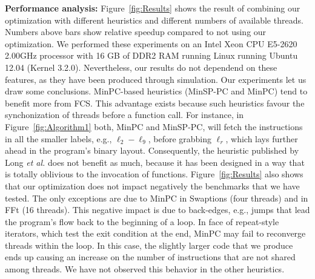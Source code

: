 \documentclass[times,10pt,twocolumn]{article}
\begin{document}
\noindent
\textbf{Performance analysis:}
Figure~\ref{fig:Results} shows the result of combining our optimization with
different heuristics and different numbers of available threads.
Numbers above bars show relative speedup compared to not using our optimization.
We performed these experiments on an Intel Xeon CPU E5-2620 2.00GHz processor
with 16 GB of DDR2 RAM running Linux running Ubuntu 12.04 (Kernel 3.2.0).
Nevertheless, our results do not dependend on these features, as they
have been produced through simulation.
Our experiments let us draw some conclusions.
MinPC-based heuristics (MinSP-PC and MinPC) tend to benefit more from FCS.
This advantage exists because such heuristics favour the synchonization of threads
before a function call.
For instance, in Figure~\ref{fig:Algorithm1} both, MinPC and MinSP-PC, will
fetch the instructions in all the smaller labels, e.g., $\ell_2 - \ell_9$, before
grabbing $\ell_r$, which lays further ahead in the program's binary layout.
Consequently, the heuristic published by Long {\em et al.} does not benefit as
much, because it has been designed in a way that is totally oblivious to the
invocation of functions.
Figure~\ref{fig:Results} also shows that our optimization does not impact
negatively the benchmarks that we have tested.
The only exceptions are due to MinPC in Swaptions (four threads) and in
FFt (16 threads).
This negative impact is due to back-edges, e.g., jumps that lead the
program's flow back to the beginning of a loop.
In face of repeat-style iterators, which test the exit condition at the end,
MinPC may fail to reconverge threads within the loop.
In this case, the slightly larger code that we produce ends up causing an
increase on the number of instructions that are not shared among threads.
We have not observed this behavior in the other heuristics.
\end{document}

